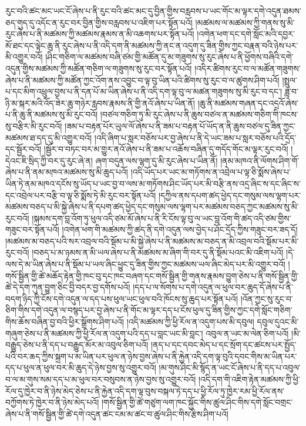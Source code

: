 རུང་བའི་ཚང་མང་ཡང་ངོ་ཞེས་པ་ནི་རུང་བའི་ཚང་མང་དུ་བྱིན་གྱིས་བརླབས་པ་ཡང་གོང་མ་ལྟར་དགེ་འདུན་ཐམས་ཅད་གུད་དུ་འདོང་ན་རུང་བར་བྱིན་གྱིས་བརླབས་པ་འཇིག་པར་སྟོན་པའོ། །མཚམས་ལ་མཚམས་ཀྱི་གནས་སུ་མི་རུང་ཞེས་པ་ནི་མཚམས་ཀྱི་མཚམས་རྣམས་ན་མི་འཆགས་པར་སྟོན་པའོ། །འགེན་ཕག་དང་དགེ་སློང་མའི་དབྱར་མོ་ཐང་དང་ལྟེང་ཆུ་ནི་རུང་ཞེས་པ་ནི་འདི་དག་ནི་མཚམས་ཀྱི་ནང་ན་འདུག་དུ་ཟིན་གྱིས་ཀྱང་བརྣན་བའི་ཉེས་པར་མི་འགྱུར་བའོ། །ཤིང་གཅིག་ལ་མཚམས་བཞི་ཙམ་གྱི་མཚོན་དུ་མ་གཟུགས་སུ་རུང་ཞེས་པ་ནི་ཕྱོགས་བཞིའི་དགེ་འདུན་གྱིས་མཚམས་ཀྱི་མཚོན་གཅིག་ལ་གཟུགས་སུ་རུང་བར་སྟོན་པའོ། །འདིར་ཚིགས་རུང་བ་ལ་མཚོན་གཟུགས་ཞེས་པ་ནི་མཚམས་ཀྱི་མཚོན་ཀྱང་འོག་ནས་འབྱུང་བ་ལྟ་བུ་ཡིན་པའི་ཚིགས་སུ་རུང་བ་ལ་ཚུགས་ཤིག་པའོ། །སྤྲུལ་པ་དང་མིག་འཕྲུལ་བྱས་པ་ནི་དན་པོ་མ་ཡིན་ཞེས་པ་ནི་འདི་དག་ལྟ་བུ་ལ་མཚན་གཟུགས་སུ་མི་རུང་བ་དང་། ཟླ་བ་ཉི་མ་སྐར་མའི་འོད་ཟེར་ཆུ་གཉེར་རླབས་རྣམས་ནི་གྱི་ནའོ་ཞེས་པ་ཡིན་ནོ། །ཆུ་ནི་མཚམས་གཞན་དང་འདྲའོ་ཞེས་པ་ནི་ཆུ་ནི་མཚམས་སུ་མི་རུང་བའོ། །བཙལ་གཅིག་ཏུ་མི་རུང་ཞེས་པ་ནི་ཆུས་བཙལ་ན་མཚམས་གཅིག་གི་ཁངས་སུ་བརྩིར་མི་རུང་བའོ། །ཟམ་པ་བརྟན་པོར་ཡུལ་ལོ་ཞེས་པ་ནི་ཟམ་པ་བརྟན་པོ་ཡོད་ན་ནི་ཆུས་བཙལ་དུ་ཟིན་ཀྱང་མཚམས་ཐ་དད་དུ་མི་འགྱུར་བའོ། །འདི་ཞིག་པ་སླར་བཅོས་པར་བྱ་ཞེས་པ་ནི་དེ་ཡང་ཟམ་པ་སླར་བཅོས་པའི་དྲོད་དང་སྦྱོར་བའོ། །སྦྱོར་བ་བཏང་བར་མ་གྱུར་ནའོ་ཞེས་པ་ནི་ཟམ་པ་འཆོས་བཞིན་དུ་གདོད་གོང་མ་ལྟར་རུང་བའོ། །དེའང་ཇི་སྲིད་ཀྱི་བར་དུ་རུང་ཞེ་ན། ཞག་བདུན་ལས་ལྷག་དུ་མི་རུང་ཞེས་པ་ཡིན་ནོ། །ནམ་མཁའ་ནི་ལོགས་ཤིག་གོ་ཞེས་པ་ནི་ནམ་མཁའ་མཚམས་སུ་མི་ཆུད་པའོ། །འདི་ཡོད་པར་ཡང་མ་གཏོགས་ན་འབྲེལ་པ་ལྟ་ཅི་སྨོས་ཞེས་པ་ཡིན་ཏེ་ནམ་མཁའ་དངོས་སུ་ཡོད་པ་ཡང་བྱ་བ་ལས་མ་གཏོགས་ཤིང་ཡོད་པར་མི་བརྩི་ནས་འདྲ་ཞིང་ས་དང་ཞིང་ས་དང་འབྲེལ་པར་བརྩི་བ་ལྟ་ཅི་སྨོས་ཏེ་མི་རུང་བར་སྟོན་པའོ། །དཀྱིལ་ནས་དཔག་ཚད་ཕྱེད་དང་གསུམ་ལས་ལྷག་པར་མཚམས་བཅད་པ་མི་སྐྱེ་ཞེས་པ་ནི་དཔག་ཚད་ཕྱེད་དང་གསུམ་ལས་ལྷག་པར་མཚམས་བཅད་ཀྱང་མཚམས་སུ་མི་རུང་བའོ། །སྐམས་དག་བླ་འོག་ཏུ་ཕུལ་འདི་ཙམ་མོ་ཞེས་པ་ནི་རི་ངོས་ལྟ་བུ་ལ་ཡང་བླ་འོག་གི་ཚད་འདི་ཙམ་གྱིས་གཟུང་བར་སྟོན་པའོ། །འགེན་ཕག་གི་མཚམས་ཀྱི་ཚད་ནི་དགེ་འདུན་ལས་བྱེད་པ་ཤོང་དྲོད་ཀྱིས་གཟུང་བར་ཟད་དོ། །མཚམས་མ་བཅད་པའི་སར་འབྲལ་བའི་སྡོམ་པ་མི་སྐྱེ་ཞེས་པ་ནི་མཚམས་མ་བཅད་ན་མི་འབྲལ་བའི་སྡོམ་པར་མི་རུང་བའོ། །བཅད་པ་མ་ཉམས་ན་མི་ཡལ་ཞེས་པ་ནི་མཚམས་མ་ཞིག་གི་བར་དུ་ནི་སྡོམ་པའང་མི་འཇིག་པའོ། །དེ་ལས་དེ་མ་ཡིན་ཞེས་པ་ནི་སྡོམ་པ་ཡལ་ཞིང་ཕྱུང་དུ་ཟིན་གྱིས་ཀྱང་མཚམས་ཡལ་ཞིང་མེད་པར་མི་འགྱུར་བའོ། །གསོ་སྦྱིན་གྱི་ཚེ་མཆོད་རྟེན་གྱི་ཁང་བུ་དང་ཁང་བཞག་དང་གསོ་སྦྱིན་གྱི་གནས་རྣམས་བྱུག་ཅེས་པ་ནི་གསོ་སྦྱིན་གྱི་ཚེ་དེ་དག་ཀུན་བྱུག་ཅིང་བྱི་བདར་བྱ་དགོས་པའོ། །དད་པ་ལ་སོགས་པ་དགེ་འདུན་ལ་ཕུལ་བར་ཆུད་དོ་ཞེས་པ་ནི་བདག་ཉིད་ཀྱི་ངོས་དགེ་འདུན་ལ་དད་པས་ཕུལ་ཡང་ཕུལ་བའི་ཁོངས་སུ་ཆུད་པར་སྟོན་པའོ། །འོན་ཀྱང་སུ་རུང་བ་ཅིག་གིས་དགེ་འདུན་ལ་བསྙད་པར་བྱ་ཞེས་པ་ནི་གོང་མ་ལྟར་དད་པ་ངོས་ཕུལ་དུ་ཟིན་གྱིས་ཀྱང་དགེ་སློང་གཅིག་གིས་ཆོས་བཞིན་བྱ་བའི་ཕྱིར་སྒྲོགས་ཤིག་པའོ། །འདི་མཚམས་ཀྱི་ཕྱི་རོལ་ན་འདུག་པས་མི་དབུལ། དབུལ་དུའང་མི་གཞུག་ཅེས་པ་ནི་མཚམས་ཀྱི་ཕྱི་རོལ་ན་འདུག་པའི་དད་པ་བླང་ཡང་མི་བླང་། འབུལ་ན་ཡང་མ་ལེན་ཅིག་པའོ། །མི་བརྒྱུད་ཅེས་པ་ནི་དད་པ་བརྒྱུད་མོར་མ་འབུལ་ཅིག་པའོ། །ནད་པ་དང་དབང་མེད་པ་དང་སྲོག་དང་ཚངས་པར་སྤྱོད་པའི་བར་ཆད་ཀྱིས་སྐྲག་པ་མ་ཡིན་པར་ཕུལ་ན་ཉེས་བྱས་ཞེས་པ་ནི་རྐྱེན་འདི་དག་ལྟ་བུའི་དབང་གིས་མ་ཡིན་པར་དད་པ་ཕུལ་ན་ཕུལ་བར་མི་ཆུད་དེ་ཉེས་བྱས་སུ་འགྱུར་བའོ། །མ་གུས་ཤིང་མི་སྙོད་ན་ཡང་ངོ་ཞེས་པ་ནི་དད་པ་འབུལ་བ་ལ་མ་གུས་སམ་དད་པ་མ་ཕུལ་བར་བསུབས་ན་ཉེས་བྱས་སུ་འགྱུར་བའོ། །འདི་དག་གི་འཇིག་རྟེན་མཚམས་ཀྱི་ཕྱི་རོལ་དུ་ཁྱེར་བ་ནི་ཉེས་མེད་ཅེས་པ་ནི་རྐྱེན་འདི་དག་ལྟ་བུས་བསྐལ་ཏེ་དད་པ་ཕྱི་རོལ་ཏུ་ཁྱེར་རམ་ཕྱི་རོལ་ནས་བཀྱོགས་ཏེ་ཁྱེར་བ་ནི་ཉེས་མེད་པའོ། །གསོ་སྦྱིན་གྱི་ཚེ་གཙུག་ལག་ཁང་སྐྱོང་གིས་ཚུལ་ཤིང་གིས་དགེ་སློང་བགྲང་ཞེས་པ་ནི་གསོ་སྦྱིན་གྱི་ཚེ་དགེ་འདུན་ཚང་ངམ་མ་ཚང་བ་ཚུལ་ཤིང་གིས་རྩིས་ཤིག་པའོ། 
